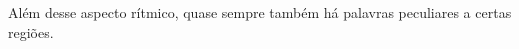 Além desse aspecto rítmico, quase sempre também há palavras peculiares a
certas regiões. 
%
%
%
%
%
